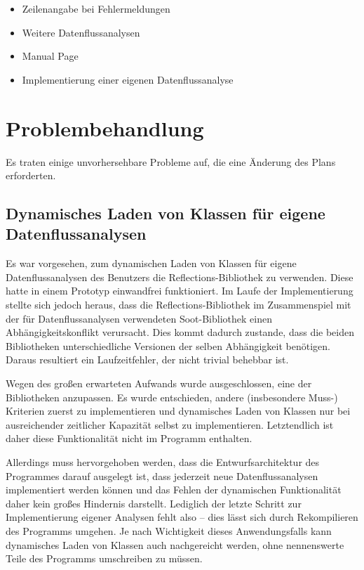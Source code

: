 \begin{itemize}
  \item Zeilenangabe bei Fehlermeldungen
  \item Weitere Datenflussanalysen
  \item Manual Page
  \item Implementierung einer eigenen Datenflussanalyse
\end{itemize}

\newpage
\section{Problembehandlung}

Es traten einige unvorhersehbare Probleme auf, die eine Änderung des Plans erforderten.

\subsection{Dynamisches Laden von Klassen für eigene Datenflussanalysen}

Es war vorgesehen, zum dynamischen Laden von Klassen für eigene Datenflussanalysen des Benutzers die Reflections-Bibliothek zu verwenden.
Diese hatte in einem Prototyp einwandfrei funktioniert.
Im Laufe der Implementierung stellte sich jedoch heraus, dass die Reflections-Bibliothek im Zusammenspiel mit der für Datenflussanalysen verwendeten Soot-Bibliothek einen Abhängigkeitskonflikt verursacht.
Dies kommt dadurch zustande, dass die beiden Bibliotheken unterschiedliche Versionen der selben Abhängigkeit benötigen. 
Daraus resultiert ein Laufzeitfehler, der nicht trivial behebbar ist.

Wegen des großen erwarteten Aufwands wurde ausgeschlossen, eine der Bibliotheken anzupassen. 
Es wurde entschieden, andere (insbesondere Muss-) Kriterien zuerst zu implementieren und dynamisches Laden von Klassen nur bei ausreichender zeitlicher Kapazität selbst zu implementieren.
Letztendlich ist daher diese Funktionalität nicht im Programm enthalten.

Allerdings muss hervorgehoben werden, dass die Entwurfsarchitektur des Programmes darauf ausgelegt ist, dass jederzeit neue Datenflussanalysen implementiert werden können und das Fehlen der dynamischen Funktionalität daher kein großes Hindernis darstellt.
Lediglich der letzte Schritt zur Implementierung eigener Analysen fehlt also – dies lässt sich durch Rekompilieren des Programms umgehen.
Je nach Wichtigkeit dieses Anwendungsfalls kann dynamisches Laden von Klassen auch nachgereicht werden, ohne nennenswerte Teile des Programms umschreiben zu müssen.

